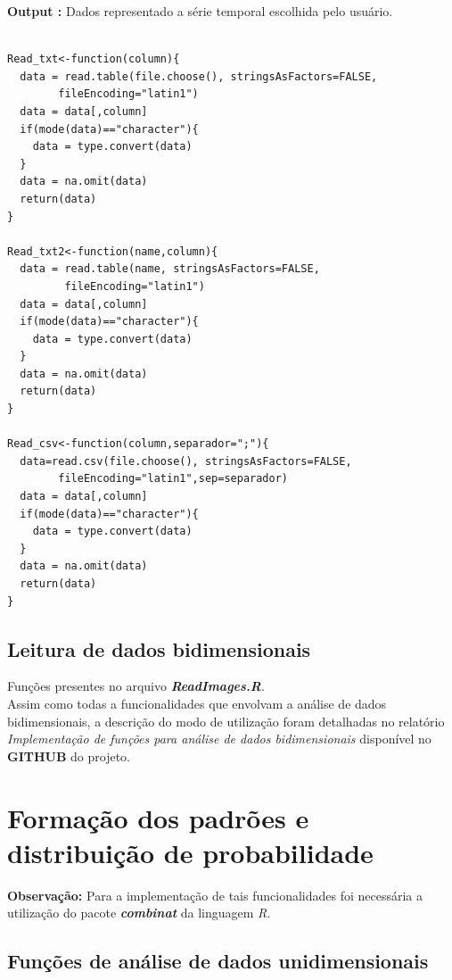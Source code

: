 \documentclass[12pt,letterpaper]{article}
\begin{document}
\textbf{Output :} Dados representado a série temporal escolhida pelo usuário.\\

\begin{lstlisting}

Read_txt<-function(column){
  data = read.table(file.choose(), stringsAsFactors=FALSE,
  		fileEncoding="latin1")
  data = data[,column]
  if(mode(data)=="character"){
    data = type.convert(data)
  }
  data = na.omit(data)
  return(data)
}

Read_txt2<-function(name,column){
  data = read.table(name, stringsAsFactors=FALSE,
  		 fileEncoding="latin1")
  data = data[,column]
  if(mode(data)=="character"){
    data = type.convert(data)
  }
  data = na.omit(data)
  return(data)
}

Read_csv<-function(column,separador=";"){
  data=read.csv(file.choose(), stringsAsFactors=FALSE,
  		fileEncoding="latin1",sep=separador)
  data = data[,column]
  if(mode(data)=="character"){
    data = type.convert(data)
  }
  data = na.omit(data)
  return(data)
}

\end{lstlisting}

\subsection{Leitura de dados bidimensionais}

Funções presentes no arquivo \textbf{\textit{ReadImages.R}}.\\

Assim como todas a funcionalidades que envolvam a análise de dados bidimensionais, a descrição do modo de utilização foram detalhadas no relatório \textit{Implementação de funções para análise de dados bidimensionais} disponível no \textbf{GITHUB} do projeto.

\section{Formação dos padrões e distribuição de probabilidade}

\textbf{Observação:} Para a implementação de tais funcionalidades foi necessária a utilização do pacote \textit{\textbf{combinat}} da linguagem \textit{R}.

\subsection{Funções de análise de dados unidimensionais}
\end{document}
